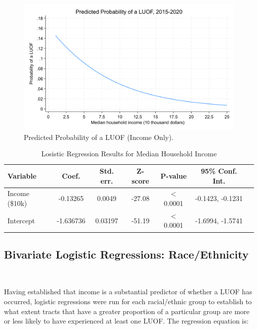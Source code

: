 \documentclass[12pt]{article}
\begin{document}
\begin{figure}[H]
  \centering %
  \includegraphics[width=\linewidth]{images/LUOF_logit_income_only}
  \captionsetup{justification=centering, singlelinecheck=false, margin=2cm}
  \caption[Predicted Probability of a LUOF (Income Only)]{Predicted Probability of a LUOF (Income Only).}
  \label{fig:logit_income_plot}
\end{figure}

\begin{table}[ht]
\centering
\begin{tabular}{lcccccc}
\toprule
\textbf{Variable} & \textbf{Coef.} & \textbf{Std. err.} & \textbf{Z-score} & \textbf{P-value} & \textbf{95\% Conf. Int.} \\
\midrule
Income (\$10k) & -0.13265 & 0.0049 & -27.08 & $<$0.0001 & -0.1423, -0.1231 \\
Intercept & -1.636736 & 0.03197 & -51.19 & $<$0.0001 & -1.6994, -1.5741 \\
\bottomrule
\end{tabular}
\caption{Losistic Regression Results for Median Household Income}
\label{tab:income_logit}
\end{table}

\subsection{Bivariate Logistic Regressions: Race/Ethnicity}\

Having established that income is a substantial predictor of whether a LUOF has occurred, logistic regressions were run for each racial/ethnic group to establish to what extent tracts that have a greater proportion of a particular group are more or less likely to have experienced at least one LUOF. The regression equation is:
\end{document}
